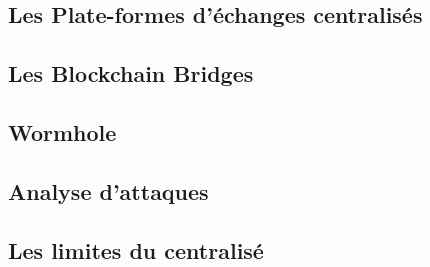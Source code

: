 \subsection{Les Plate-formes d'échanges centralisés}


\subsection{Les Blockchain Bridges}


\subsection{Wormhole}


\subsection{Analyse d'attaques}


\subsection{Les limites du centralisé}
